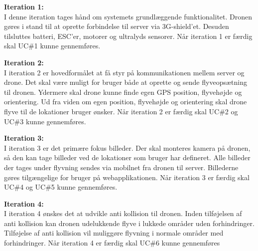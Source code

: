 \textbf{Iteration 1:} \\
I denne iteration tages hånd om systemets grundlæggende funktionalitet.  Dronen gøres i stand til at oprette forbindelse til server via 3G-shield'et. Desuden tilsluttes batteri, ESC'er, motorer og ultralyds sensorer. Når iteration 1 er færdig skal UC\#1 kunne gennemføres. 



\textbf{Iteration 2:} \\
I iteration 2 er hovedformålet at få styr på kommunikationen mellem server og drone. Det skal være muligt for bruger både at oprette og sende flyveopsætning til dronen. 
Ydermere skal drone kunne finde egen GPS position, flyvehøjde og orientering. Ud fra viden om egen position, flyvehøjde og orientering skal drone flyve til de lokationer bruger ønsker. Når iteration 2 er færdig skal UC\#2 og UC\#3 kunne gennemføres.  

\textbf{Iteration 3:}  \\
I iteration 3 er det primære fokus billeder. Der skal monteres kamera på dronen, så den kan tage billeder ved de lokationer som bruger har defineret. Alle billeder der tages under flyvning sendes via mobilnet fra dronen til server. Billederne gøres tilgængelige for bruger på webapplikationen. Når iteration 3 er færdig skal UC\#4 og UC\#5 kunne gennemføres.

\textbf{Iteration 4:} \\
I iteration 4 ønskes det at udvikle anti kollision til dronen. 
Inden tilføjelsen af anti kollision kan dronen udelukkende flyve i lukkede områder uden forhindringer. Tilføjelse af anti kollision vil muliggøre flyvning i normale områder med forhindringer. Når iteration 4 er færdig skal UC\#6 kunne gennemføres  